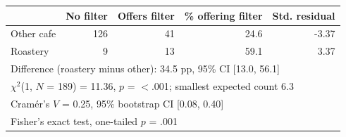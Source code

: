 \begin{tabular}{lrrrr}
\toprule
  & No filter & Offers filter & \% offering filter & Std. residual \\
\midrule
Other cafe & 126 & 41 & 24.6 & -3.37 \\
Roastery &   9 & 13 & 59.1 & 3.37 \\
\midrule
\multicolumn{5}{l}{Difference (roastery minus other): 34.5 pp, 95\% CI [13.0, 56.1]} \\
\multicolumn{5}{l}{$\chi^2$(1, $N$ = 189) = 11.36, $p$ = $<$.001; smallest expected count 6.3} \\
\multicolumn{5}{l}{Cram\'er's $V$ = 0.25, 95\% bootstrap CI [0.08, 0.40]} \\
\multicolumn{5}{l}{Fisher's exact test, one-tailed $p$ = .001} \\
\bottomrule
\end{tabular}
